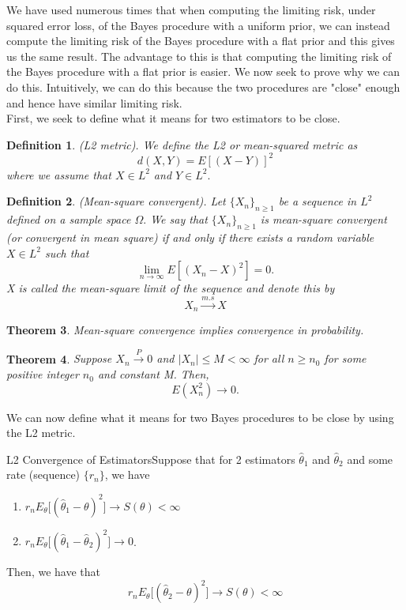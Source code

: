 \documentclass[twoside]{article}
\newcounter{lecnum}
\newtheorem{theorem}{Theorem}[lecnum]
\newtheorem{definition}[theorem]{Definition}
\begin{document}
We have used numerous times that when computing the limiting risk, under squared error loss, of the Bayes procedure with a uniform prior, we can instead compute the limiting risk of the Bayes procedure with a flat prior and this gives us the same result. The advantage to this is that computing the limiting risk of the Bayes procedure with a flat prior is easier. We now seek to prove why we can do this. Intuitively, we can do this because the two procedures are "close" enough and hence have similar limiting risk. \\

First, we seek to define what it means for two estimators to be close.
\begin{definition}(L2 metric). We define the L2 or mean-squared metric as 
$$
d(X,Y) = E[(X-Y)]^2
$$
where we assume that $X \in L^2$ and $Y \in L^2.$
\end{definition}

\begin{definition}(Mean-square convergent). Let $\{X_n\}_{n \geq 1}$ be a sequence in $L^2$ defined on a sample space $\Omega.$ We say that $\{X_n\}_{n \geq 1}$ is mean-square convergent (or convergent in mean square) if and only if there exists a random variable $X \in L^2$ such that 
$$
\lim_{n \rightarrow \infty}E[(X_n - X)^2] = 0.
$$
X is called the mean-square limit of the sequence and denote this by 
$$
X_n \xrightarrow{m.s}X
$$
\end{definition}

\begin{theorem}Mean-square convergence implies convergence in probability.
\end{theorem}

\begin{theorem}Suppose $X_n \xrightarrow{P} 0$ and $|X_n| \leq M < \infty$ for all $n \geq n_0$ for some positive integer $n_0$ and constant M. Then, 
$$
E(X_{n}^{2}) \rightarrow 0.
$$
\end{theorem}

We can now define what it means for two Bayes procedures to be close by using the L2 metric.
\begin{theorem_exam}{L2 Convergence of Estimators}{}Suppose that for 2 estimators $\hat{\theta}_1$ and $\hat{\theta}_2$ and some rate (sequence) $\{r_n\}$, we have 
\begin{enumerate}
\item $r_nE_{\theta}\bigg[(\hat{\theta}_1 - \theta)^2 \bigg] \rightarrow S(\theta) < \infty$
\item  $r_nE_{\theta}\bigg[(\hat{\theta}_1 - \hat{\theta}_2)^2 \bigg] \rightarrow 0$.
\end{enumerate}
Then, we have that 
$$
r_nE_{\theta}\bigg[(\hat{\theta}_2 - \theta)^2 \bigg] \rightarrow S(\theta) < \infty
$$
\end{theorem_exam}
\end{document}
